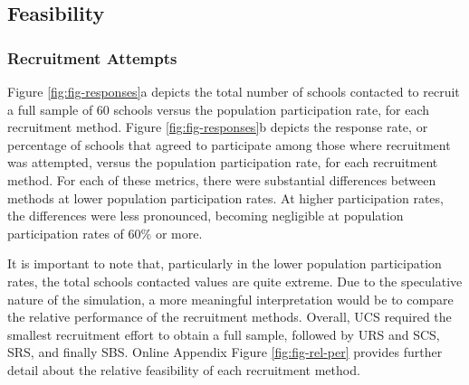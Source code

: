 \documentclass[
  man,floatsintext]{apa6}
\begin{document}
\hypertarget{feasibility-1}{%
\subsection*{Feasibility}\label{feasibility-1}}

\hypertarget{recruitment-attempts}{%
\subsubsection*{Recruitment Attempts}\label{recruitment-attempts}}

Figure \ref{fig:fig-responses}a depicts the total number of schools contacted to recruit a full sample of 60 schools versus the population participation rate, for each recruitment method. Figure \ref{fig:fig-responses}b depicts the response rate, or percentage of schools that agreed to participate among those where recruitment was attempted, versus the population participation rate, for each recruitment method. For each of these metrics, there were substantial differences between methods at lower population participation rates. At higher participation rates, the differences were less pronounced, becoming negligible at population participation rates of 60\% or more.

It is important to note that, particularly in the lower population participation rates, the total schools contacted values are quite extreme. Due to the speculative nature of the simulation, a more meaningful interpretation would be to compare the relative performance of the recruitment methods. Overall, UCS required the smallest recruitment effort to obtain a full sample, followed by URS and SCS, SRS, and finally SBS. Online Appendix Figure \ref{fig:fig-rel-per} provides further detail about the relative feasibility of each recruitment method.
\end{document}
